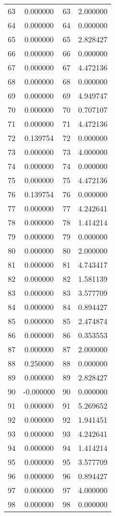 \documentclass[12pt]{article}
\begin{document}
\begin{longtable}{@{}cccc@{}}
63 & 0.000000 & 63 & 2.000000 \\
64 & 0.000000 & 64 & 0.000000 \\
65 & 0.000000 & 65 & 2.828427 \\
66 & 0.000000 & 66 & 0.000000 \\
67 & 0.000000 & 67 & 4.472136 \\
68 & 0.000000 & 68 & 0.000000 \\
69 & 0.000000 & 69 & 4.949747 \\
70 & 0.000000 & 70 & 0.707107 \\
71 & 0.000000 & 71 & 4.472136 \\
72 & 0.139754 & 72 & 0.000000 \\
73 & 0.000000 & 73 & 4.000000 \\
74 & 0.000000 & 74 & 0.000000 \\
75 & 0.000000 & 75 & 4.472136 \\
76 & 0.139754 & 76 & 0.000000 \\
77 & 0.000000 & 77 & 4.242641 \\
78 & 0.000000 & 78 & 1.414214 \\
79 & 0.000000 & 79 & 0.000000 \\
80 & 0.000000 & 80 & 2.000000 \\
81 & 0.000000 & 81 & 4.743417 \\
82 & 0.000000 & 82 & 1.581139 \\
83 & 0.000000 & 83 & 3.577709 \\
84 & 0.000000 & 84 & 0.894427 \\
85 & 0.000000 & 85 & 2.474874 \\
86 & 0.000000 & 86 & 0.353553 \\
87 & 0.000000 & 87 & 2.000000 \\
88 & 0.250000 & 88 & 0.000000 \\
89 & 0.000000 & 89 & 2.828427 \\
90 & -0.000000 & 90 & 0.000000 \\
91 & 0.000000 & 91 & 5.269652 \\
92 & 0.000000 & 92 & 1.941451 \\
93 & 0.000000 & 93 & 4.242641 \\
94 & 0.000000 & 94 & 1.414214 \\
95 & 0.000000 & 95 & 3.577709 \\
96 & 0.000000 & 96 & 0.894427 \\
97 & 0.000000 & 97 & 4.000000 \\
98 & 0.000000 & 98 & 0.000000 \\

\end{longtable}
\end{document}

